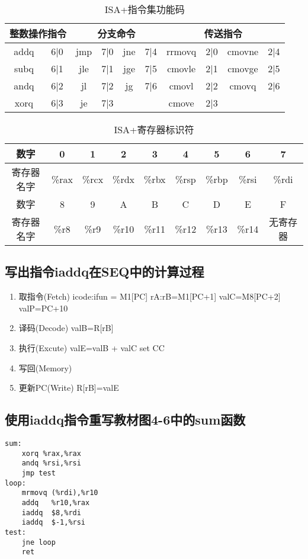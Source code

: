 \begin{table}[H]
    \centering
   \begin{tabular}{|c|c|c|c|c|c|c|c|c|c|}
       \hline 
       \multicolumn{2}{|c|}{整数操作指令} & \multicolumn{4}{|c|}{分支命令} & \multicolumn{4}{|c|}{传送指令} \\ 
       \hline 
       addq & 6|0 & jmp & 7|0 & jne & 7|4 & rrmovq & 2|0 & cmovne & 2|4 \\ 
       \hline 
       subq & 6|1 & jle & 7|1 & jge & 7|5 & cmovle & 2|1 & cmovge & 2|5 \\ 
       \hline 
       andq & 6|2 & jl & 7|2 & jg & 7|6 & cmovl & 2|2 & cmovq & 2|6 \\ 
       \hline 
       xorq & 6|3 & je & 7|3 &  &  & cmove & 2|3 &  &  \\ 
       \hline 
   \end{tabular} 
   \caption{ISA+指令集功能码}
\end{table}

\begin{table}[H]
    \centering
    \begin{tabular}{|c|c|c|c|c|c|c|c|c|}
        \hline 
        数字 & 0 & 1 & 2 & 3 & 4 & 5 & 6 & 7  \\ 
        \hline 
        寄存器名字 & \%rax & \%rcx & \%rdx & \%rbx & \%rsp & \%rbp & \%rsi & \%rdi  \\ 
        \hline 
        数字 & 8 & 9 & A & B & C & D & E & F \\
        \hline
        寄存器名字 & \%r8 & \%r9 & \%r10 & \%r11 & \%r12 & \%r13 & \%r14 & 无寄存器 \\
        \hline
    \end{tabular} 
    \caption{ISA+寄存器标识符}
\end{table}

\subsection{写出指令iaddq在SEQ中的计算过程}

\begin{enumerate}
    \item 取指令(Fetch)
    \subitem icode:ifun = M1[PC]
    \subitem rA:rB=M1[PC+1]
    \subitem valC=M8[PC+2]
    \subitem valP=PC+10
    \item 译码(Decode)
    \subitem valB=R[rB]
    \item 执行(Excute)
    \subitem valE=valB + valC
    \subitem set CC
    \item 写回(Memory)
    \item 更新PC(Write)
    \subitem R[rB]=valE
\end{enumerate}

\subsection{使用iaddq指令重写教材图4-6中的sum函数}

\begin{lstlisting}
sum:
    xorq %rax,%rax
    andq %rsi,%rsi
    jmp test
loop:
    mrmovq (%rdi),%r10
    addq   %r10,%rax
    iaddq  $8,%rdi
    iaddq  $-1,%rsi
test:
    jne loop
    ret
\end{lstlisting}

